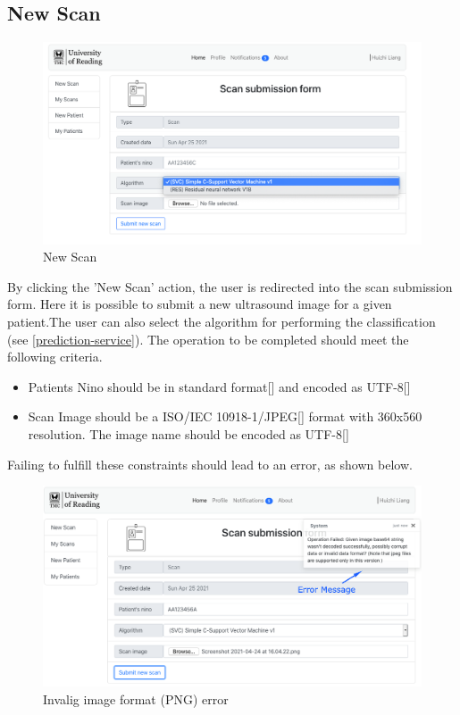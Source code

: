 		\subsection{New Scan}
			\label{new-scan}
			\begin{figure}[H]
				\iftrue
				\centering
				\caption{New Scan}
				\includegraphics[scale=0.3]{figures/newscan}
				\fi
			\end{figure}
			By clicking the 'New Scan' action, the user is redirected into the scan submission form. Here it is possible to 
			submit a new ultrasound image for a given patient.The user can also select the algorithm for performing the 
			classification (see \ref{prediction-service}). The operation to be completed should meet the following criteria.
			\begin{itemize}
				\item Patients Nino should be in standard format[\cite{nino-format}] and encoded as UTF-8[\cite{rfc3629}]
				\item Scan Image should be a ISO/IEC 10918-1/JPEG[\cite{jpeg-iso10918-1}] format with 360x560 resolution. The image name
				should be encoded as UTF-8[\cite{rfc3629}]
			\end{itemize}
			Failing to fulfill these constraints should lead to an error, as shown below.
			\begin{figure}[H]
				\iftrue
				\centering
				\caption{Invalig image format (PNG) error}
				\includegraphics[scale=0.3]{figures/newscan-error}
				\fi
			\end{figure}
			
			
			
			
			
			
			
		
	



